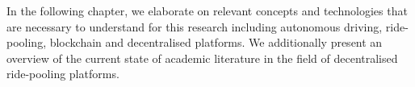 In the following chapter, we elaborate on relevant concepts and technologies that are necessary to understand for this research including autonomous driving, ride-pooling, blockchain and decentralised platforms. We additionally present an overview of the current state of academic literature in the field of decentralised ride-pooling platforms. 
